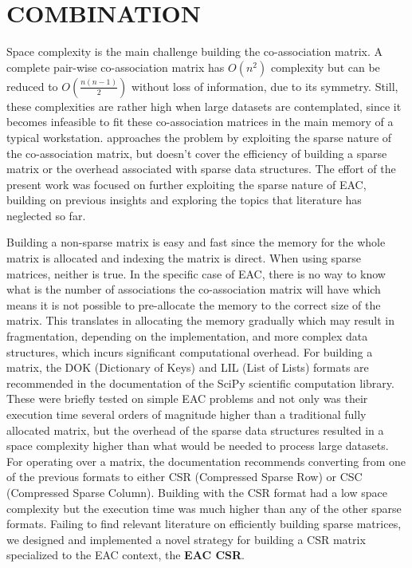 \section{\uppercase{Combination}}
\label{sec:combination}

\noindent Space complexity is the main challenge building the co-association matrix.
A complete pair-wise co-association matrix has $O(n^2)$ complexity but can be reduced to $O(\frac{n(n-1)}{2})$ without loss of information, due to its symmetry.
Still, these complexities are rather high when large datasets are contemplated, since it becomes infeasible to fit these co-association matrices in the main memory of a typical workstation.
\cite{Lourenco2010} approaches the problem by exploiting the sparse nature of the co-association matrix, but doesn't cover the efficiency of building a sparse matrix or the overhead associated with sparse data structures.
The effort of the present work was focused on further exploiting the sparse nature of EAC, building on previous insights and exploring the topics that literature has neglected so far.

Building a non-sparse matrix is easy and fast since the memory for the whole matrix is allocated and indexing the matrix is direct.
When using sparse matrices, neither is true.
In the specific case of EAC, there is no way to know what is the number of associations the co-association matrix will have which means it is not possible to pre-allocate the memory to the correct size of the matrix.
This translates in allocating the memory gradually which may result in fragmentation, depending on the implementation, and more complex data structures, which incurs significant computational overhead.
For building a matrix, the DOK (Dictionary of Keys) and LIL (List of Lists) formats are recommended in the documentation of the SciPy \cite{JonesSciPy} scientific computation library.
These were briefly tested on simple EAC problems and not only was their execution time several orders of magnitude higher than a traditional fully allocated matrix, but the overhead of the sparse data structures resulted in a space complexity higher than what would be needed to process large datasets.
For operating over a matrix, the documentation recommends converting from one of the previous formats to either CSR (Compressed Sparse Row) or CSC (Compressed Sparse Column).
Building with the CSR format had a low space complexity but the execution time was much higher than any of the other sparse formats.
Failing to find relevant literature on efficiently building sparse matrices, we designed and implemented a novel strategy for building a CSR matrix specialized to the EAC context, the \textbf{EAC CSR}.

